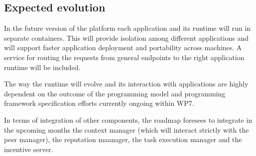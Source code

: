 

\subsection{Expected evolution}

In the future version of the platform each application and its runtime will run in separate containers. This will provide isolation among different applications and will support faster application deployment and portability across machines. A service for routing the requests from general endpoints to the right application runtime will be included.

The way the runtime will evolve and its interaction with applications are highly dependent on the outcome of the programming model and programming framework specification efforts currently ongoing within WP7.

In terms of integration of other components, the roadmap foresees to integrate in the upcoming months the context manager (which will interact strictly with the peer manager), the reputation maanager, the task execution manager and the incentive server.